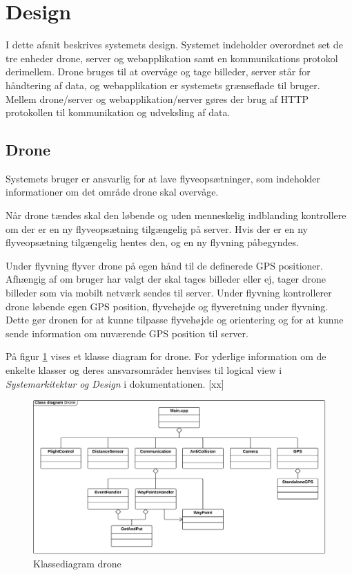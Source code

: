 \section{Design}

I dette afsnit beskrives systemets design. Systemet indeholder overordnet set de tre enheder drone, server og webapplikation samt en kommunikations protokol derimellem. Drone bruges til at overvåge og tage billeder, server står for håndtering af data, og webapplikation er systemets grænseflade til bruger. Mellem drone/server og webapplikation/server gøres der brug af HTTP protokollen til kommunikation og udveksling af data.



\subsection{Drone}

Systemets bruger er ansvarlig for at lave flyveopsætninger, som indeholder informationer om det område drone skal overvåge.

Når drone tændes skal den løbende og uden menneskelig indblanding kontrollere om der er en ny flyveopsætning tilgængelig på server. Hvis der er en ny flyveopsætning tilgængelig hentes den, og en ny flyvning påbegyndes. 

Under flyvning flyver drone på egen hånd til de definerede GPS positioner. Afhængig af om bruger har valgt der skal tages billeder eller ej, tager drone billeder som via mobilt netværk sendes til server. 
Under flyvning kontrollerer drone løbende egen GPS position, flyvehøjde og flyveretning under flyvning. Dette gør dronen for at kunne tilpasse flyvehøjde og orientering og for at kunne sende information om nuværende GPS position til server.

På figur \ref{fig:class_drone} vises et klasse diagram for drone. For yderlige information om de enkelte klasser og deres ansvarsområder henvises til logical view i \textit{Systemarkitektur og Design} i dokumentationen. [xx]


\begin{figure}[H]
\centering
\includegraphics[width=1\textwidth]{Billeder/Design_Class_drone.png}
\vspace{-0.5cm}
\caption{Klassediagram drone}
\label{fig:class_drone}
\end{figure}


